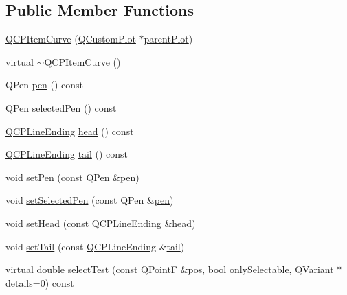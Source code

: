\subsection*{Public Member Functions}
\begin{DoxyCompactItemize}
\item 
\hyperlink{classQCPItemCurve_ac9b7508bb5c8827e1a7a6199f8c82bec}{Q\+C\+P\+Item\+Curve} (\hyperlink{classQCustomPlot}{Q\+Custom\+Plot} $\ast$\hyperlink{classQCPLayerable_ab7e0e94461566093d36ffc0f5312b109}{parent\+Plot})
\item 
virtual \hyperlink{classQCPItemCurve_ae36f20fd5deff2f1443a7c53eaa95c81}{$\sim$\+Q\+C\+P\+Item\+Curve} ()
\item 
Q\+Pen \hyperlink{classQCPItemCurve_abc6321e55a9ba1a0c7df407843dfa252}{pen} () const 
\item 
Q\+Pen \hyperlink{classQCPItemCurve_abd8b8be5b13bc4dafec4c1758c281336}{selected\+Pen} () const 
\item 
\hyperlink{classQCPLineEnding}{Q\+C\+P\+Line\+Ending} \hyperlink{classQCPItemCurve_afc067f0d1e60cd04812f2c2c7fdf36c3}{head} () const 
\item 
\hyperlink{classQCPLineEnding}{Q\+C\+P\+Line\+Ending} \hyperlink{classQCPItemCurve_a9adddfcc5275be0cf27e3c0c31c37c1a}{tail} () const 
\item 
void \hyperlink{classQCPItemCurve_a034be908440aec785c34b92843461221}{set\+Pen} (const Q\+Pen \&\hyperlink{classQCPItemCurve_abc6321e55a9ba1a0c7df407843dfa252}{pen})
\item 
void \hyperlink{classQCPItemCurve_a375b917669f868c5a106bf2f1ab7c26d}{set\+Selected\+Pen} (const Q\+Pen \&\hyperlink{classQCPItemCurve_abc6321e55a9ba1a0c7df407843dfa252}{pen})
\item 
void \hyperlink{classQCPItemCurve_a08a30d9cdd63995deea3d9e20430676f}{set\+Head} (const \hyperlink{classQCPLineEnding}{Q\+C\+P\+Line\+Ending} \&\hyperlink{classQCPItemCurve_afc067f0d1e60cd04812f2c2c7fdf36c3}{head})
\item 
void \hyperlink{classQCPItemCurve_ac3488d8b1a6489c845dc5bff3ef71124}{set\+Tail} (const \hyperlink{classQCPLineEnding}{Q\+C\+P\+Line\+Ending} \&\hyperlink{classQCPItemCurve_a9adddfcc5275be0cf27e3c0c31c37c1a}{tail})
\item 
virtual double \hyperlink{classQCPItemCurve_a741375c11667b5f9c95b2683f93ee514}{select\+Test} (const Q\+PointF \&pos, bool only\+Selectable, Q\+Variant $\ast$details=0) const 
\end{DoxyCompactItemize}
